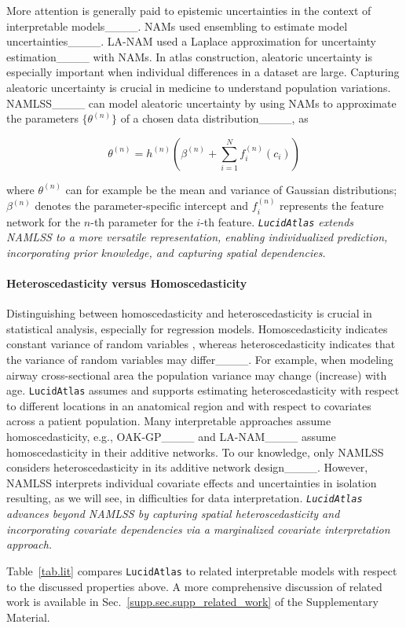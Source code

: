 More attention is generally paid to epistemic uncertainties in the context of interpretable models____. NAMs used ensembling to estimate model uncertainties____. LA-NAM used a Laplace approximation for uncertainty estimation____ with NAMs. In atlas construction, aleatoric uncertainty is especially important when individual differences in a dataset are large. Capturing aleatoric uncertainty is crucial in medicine to understand population variations. NAMLSS____ can model aleatoric uncertainty by using NAMs to approximate the parameters $\{\theta^{(n)}\}$ of a chosen data distribution____, as
\begin{small}
\begin{equation}
\theta^{(n)}=h^{(n)}\left(\beta^{(n)}+\sum_{i=1}^{N} f_{i}^{(n)}\left(c_{i}\right)\right) 
\label{eq.namlss}
\end{equation}
\end{small}
where $\theta^{(n)}$ can for example be the mean and variance of Gaussian distributions; $\beta^{(n)}$ denotes the parameter-specific intercept and $f_{i}^{(n)}$ represents the feature network for the $n$-th parameter for the $i$-th feature. \emph{\texttt{LucidAtlas} extends NAMLSS to a more versatile representation, enabling individualized prediction, incorporating prior knowledge, and capturing spatial dependencies.}

\paragraph{Heteroscedasticity versus Homoscedasticity}
Distinguishing between homoscedasticity and heteroscedasticity is crucial in statistical analysis, especially for regression models. Homoscedasticity indicates constant variance of random variables , whereas heteroscedasticity indicates that the variance of random variables may differ____. For example, when modeling airway cross-sectional area the population variance may change (increase) with age. \texttt{LucidAtlas} assumes and supports estimating heteroscedasticity with respect to different locations in an anatomical region and with respect to covariates across a patient population. Many interpretable approaches assume homoscedasticity, e.g., OAK-GP____ and LA-NAM____ assume homoscedasticity in their additive networks. To our knowledge, only NAMLSS considers heteroscedasticity in its additive network design____. However, NAMLSS interprets individual covariate effects and uncertainties in isolation resulting, as we will see, in difficulties for data interpretation. \emph{\texttt{LucidAtlas} advances beyond NAMLSS by capturing spatial heteroscedasticity and incorporating covariate dependencies via a marginalized covariate interpretation approach.}%

Table~\ref{tab.lit} compares \texttt{LucidAtlas} to related interpretable models with respect to the discussed properties above. A more comprehensive discussion of
related work is available in Sec.~\ref{supp.sec.supp_related_work} of the Supplementary Material.
